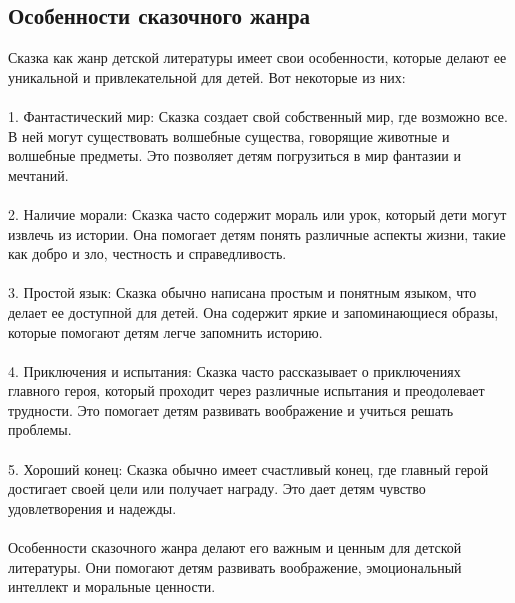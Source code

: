 \documentclass{article}
\begin{document}
\subsection{Особенности сказочного жанра}
Сказка как жанр детской литературы имеет свои особенности, которые делают ее уникальной и привлекательной для детей. Вот некоторые из них:\\
~\\
1. Фантастический мир: Сказка создает свой собственный мир, где возможно все. В ней могут существовать волшебные существа, говорящие животные и волшебные предметы. Это позволяет детям погрузиться в мир фантазии и мечтаний.\\
~\\
2. Наличие морали: Сказка часто содержит мораль или урок, который дети могут извлечь из истории. Она помогает детям понять различные аспекты жизни, такие как добро и зло, честность и справедливость.\\
~\\
3. Простой язык: Сказка обычно написана простым и понятным языком, что делает ее доступной для детей. Она содержит яркие и запоминающиеся образы, которые помогают детям легче запомнить историю.\\
~\\
4. Приключения и испытания: Сказка часто рассказывает о приключениях главного героя, который проходит через различные испытания и преодолевает трудности. Это помогает детям развивать воображение и учиться решать проблемы.\\
~\\
5. Хороший конец: Сказка обычно имеет счастливый конец, где главный герой достигает своей цели или получает награду. Это дает детям чувство удовлетворения и надежды.\\
~\\
Особенности сказочного жанра делают его важным и ценным для детской литературы. Они помогают детям развивать воображение, эмоциональный интеллект и моральные ценности.
\end{document}
